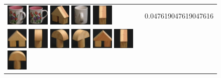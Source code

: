 \begin{figure}[!p]
\begin{center}
\begin{tabular}{m{11cm} | m{3cm} |}
\includegraphics[width=1cm]{coil/beeld-10.eps}
\includegraphics[width=1cm]{coil/beeld-6.eps}
\includegraphics[width=1cm]{coil/beeld-46.eps}
\includegraphics[width=1cm]{coil/beeld-41.eps}
\includegraphics[width=1cm]{coil/beeld-47.eps}
& {\scriptsize 0.047619047619047616}
\\
\includegraphics[width=1cm]{coil/beeld-42.eps}
\includegraphics[width=1cm]{coil/beeld-5.eps}
\includegraphics[width=1cm]{coil/beeld-4.eps}
\includegraphics[width=1cm]{coil/beeld-3.eps}
\includegraphics[width=1cm]{coil/beeld-43.eps}
\includegraphics[width=1cm]{coil/beeld-47.eps}
\includegraphics[width=1cm]{coil/beeld-1.eps}

\end{tabular}
\end{center}
\end{figure}
